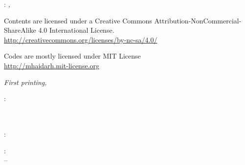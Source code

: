 

\thispagestyle{empty}

\hfill

\vfill

\noindent\myName: \textit{\myTitle,} %
\textcopyright\ \myTime

\bigskip

\noindent Contents are licensed under a Creative Commons Attribution-NonCommercial-ShareAlike 4.0 International License.\\
\url{http://creativecommons.org/licenses/by-nc-sa/4.0/}

\medskip

\noindent Codes are mostly licensed under MIT License\\
\url{http://mhaidarh.mit-license.org}

\bigskip

\noindent \textit{First printing, \myDatePrint}

\bigskip

\noindent{}: \\
\mySupervisor \\
\myExaminerA \\
\myExaminerB

\medskip

\noindent{}: \\
\myLocation

\medskip

\noindent{}: \\
\myMonthFirst \xspace \myYearFirst \xspace -- \myMonthLast \xspace \myYearLast
